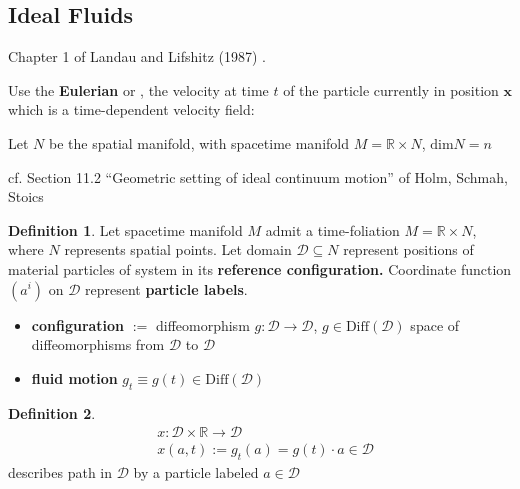 \documentclass[twoside,landscape,10pt]{amsart}
\theoremstyle{plain}
\theoremstyle{definition}
\newtheorem{definition}{Definition}
\theoremstyle{remark}
\theoremstyle{remark}
\begin{document}
\begin{multicols*}{2}
\section{Ideal Fluids} Chapter 1 of Landau and Lifshitz (1987) \cite{LLandauELifshitz1987}.  

Use the \textbf{Eulerian} or , the velocity at time $t$ of the particle currently in position $\mathbf{x}$ \cite{DHolmTSchmahCStoica2009} which is a time-dependent velocity field:

Let $N$ be the spatial manifold, with spacetime manifold $M = \mathbb{R} \times N$, $\text{dim}N=n$  


cf. Section 11.2 ``Geometric setting of ideal continuum motion'' of Holm, Schmah, Stoics \cite{DHolmTSchmahCStoica2009}
\begin{definition}
  Let spacetime manifold $M$ admit a time-foliation $M = \mathbb{R} \times N$, where $N$ represents spatial points. 
Let domain $\mathcal{D} \subseteq N$ represent positions of material particles of system in its \textbf{reference configuration.} Coordinate function $(a^i)$ on $\mathcal{D}$ represent \textbf{particle labels}.  

\begin{itemize}
  \item \textbf{configuration} $:= $ diffeomorphism $g: \mathcal{D} \to \mathcal{D}$, $g\in \text{Diff}(\mathcal{D})$ space of diffeomorphisms from $\mathcal{D}$ to $\mathcal{D}$ 
\item \textbf{fluid motion} $g_t \equiv g(t) \in \text{Diff}(\mathcal{D})$
\end{itemize}  
\end{definition}

\begin{definition}
  \begin{equation}
    \begin{aligned}
      & x: \mathcal{D} \times \mathbb{R} \to \mathcal{D} \\ 
      & x(a,t) := g_t(a) = g(t)\cdot a \in \mathcal{D}      
\end{aligned}
\end{equation} describes path in $\mathcal{D}$ by a particle labeled $a \in \mathcal{D}$
\end{definition}


\end{multicols*}
\end{document}
